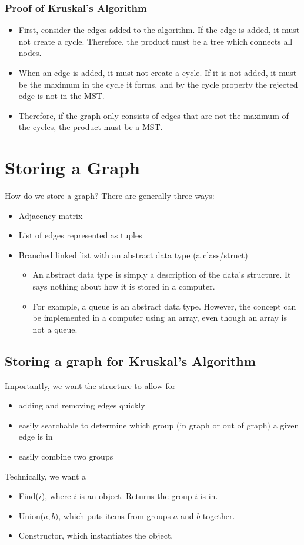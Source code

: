 \documentclass[10pt]{article}
\begin{document}
\subsubsection*{Proof of Kruskal's Algorithm}
\begin{itemize}
	\item First, consider the edges added to the algorithm.  If the edge is added, it must not create a cycle.  Therefore, the product must be a tree which connects all nodes.
	\item When an edge is added, it must not create a cycle.  If it is not added, it must be the maximum in the cycle it forms, and by the cycle property the rejected edge is not in the MST.
	\item Therefore, if the graph only consists of edges that are not the maximum of the cycles, the product must be a MST.
\end{itemize}

\section*{Storing a Graph}
How do we store a graph?  There are generally three ways:
\begin{itemize}
	\item Adjacency matrix
	\item List of edges represented as tuples
	\item Branched linked list with an abstract data type (a class/struct)
	\begin{itemize}
	    \item An abstract data type is simply a description of the data's structure.  It says nothing about how it is stored in a computer.
	    \item For example, a queue is an abstract data type.  However, the concept can be implemented in a computer using an array, even though an array is not a queue.
    \end{itemize}
\end{itemize}

\subsection*{Storing a graph for Kruskal's Algorithm}
Importantly, we want the structure to allow for
\begin{itemize}
	\item adding and removing edges quickly
	\item easily searchable to determine which group (in graph or out of graph) a given edge is in
	\item easily combine two groups
\end{itemize}
Technically, we want a 
\begin{itemize}
	\item Find($i$), where $i$ is an object.  Returns the group $i$ is in.
	\item Union($a, b)$, which puts items from groups $a$ and $b$ together.
	\item Constructor, which instantiates the object.
\end{itemize}
\end{document}

